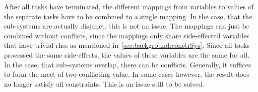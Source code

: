     After all tasks have terminated, the different mappings from variables to values of the separate tasks have to be combined to a single mapping. In the case, that the sub-systems are actually disjunct, this is not an issue. The mappings can just be combined without conflicts, since the mappings only share side-effected variables that have trivial \acp{rhs} as mentioned in~\autoref{sec:background:constrSys}. Since all tasks processed the same side-effects, the values of these variables are the same for all.
    In the case, that sub-systems overlap, there can be conflicts. Generally, it suffices to form the meet of two conflicting value. In some cases however, the result does no longer satisfy all constraints. This is an issue still to be solved.
